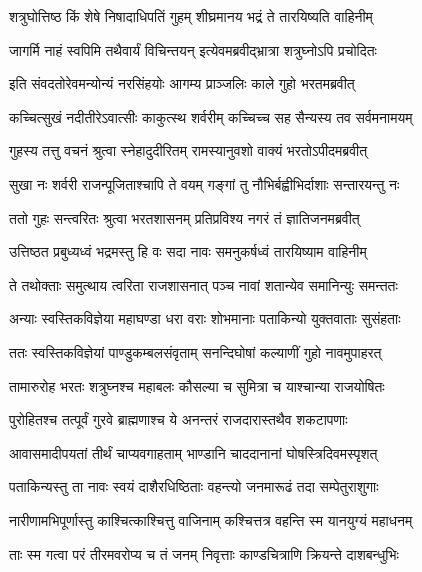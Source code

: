 \twolineshloka
{शत्रुघोत्तिष्ठ किं शेषे निषादाधिपतिं गुहम्}
{शीघ्रमानय भद्रं ते तारयिष्यति वाहिनीम्} %

\twolineshloka
{जागर्मि नाहं स्वपिमि तथैवार्यं विचिन्तयन्}
{इत्येवमब्रवीद्भ्रात्रा शत्रुघ्नोऽपि प्रचोदितः} %

\twolineshloka
{इति संवदतोरेवमन्योन्यं नरसिंहयोः}
{आगम्य प्राञ्जलिः काले गुहो भरतमब्रवीत्} %

\twolineshloka
{कच्चित्सुखं नदीतीरेऽवात्सीः काकुत्स्थ शर्वरीम्}
{कच्चिच्च सह सैन्यस्य तव सर्वमनामयम्} %

\twolineshloka
{गुहस्य तत्तु वचनं श्रुत्वा स्नेहादुदीरितम्}
{रामस्यानुवशो वाक्यं भरतोऽपीदमब्रवीत्} %

\twolineshloka
{सुखा नः शर्वरी राजन्पूजिताश्चापि ते वयम्}
{गङ्गां तु नौभिर्बह्वीभिर्दाशाः सन्तारयन्तु नः} %

\twolineshloka
{ततो गुहः सन्त्वरितः श्रुत्वा भरतशासनम्}
{प्रतिप्रविश्य नगरं तं ज्ञातिजनमब्रवीत्} %

\twolineshloka
{उत्तिष्ठत प्रबुध्यध्वं भद्रमस्तु हि वः सदा}
{नावः समनुकर्षध्वं तारयिष्याम वाहिनीम्} %

\twolineshloka
{ते तथोक्ताः समुत्थाय त्वरिता राजशासनात्}
{पञ्च नावां शतान्येव समानिन्युः समन्ततः} %

\twolineshloka
{अन्याः स्वस्तिकविज्ञेया महाघण्डा धरा वराः}
{शोभमानाः पताकिन्यो युक्तवाताः सुसंहताः} %

\twolineshloka
{ततः स्वस्तिकविज्ञेयां पाण्डुकम्बलसंवृताम्}
{सनन्दिघोषां कल्याणीं गुहो नावमुपाहरत्} %

\twolineshloka
{तामारुरोह भरतः शत्रुघ्नश्च महाबलः}
{कौसल्या च सुमित्रा च याश्चान्या राजयोषितः} %

\twolineshloka
{पुरोहितश्च तत्पूर्वं गुरवे ब्राह्मणाश्च ये}
{अनन्तरं राजदारास्तथैव शकटापणाः} %

\twolineshloka
{आवासमादीपयतां तीर्थं चाप्यवगाहताम्}
{भाण्डानि चाददानानां घोषस्त्रिदिवमस्पृशत्} %

\twolineshloka
{पताकिन्यस्तु ता नावः स्वयं दाशैरधिष्ठिताः}
{वहन्त्यो जनमारूढं तदा सम्पेतुराशुगाः} %

\twolineshloka
{नारीणामभिपूर्णास्तु काश्चित्काश्चित्तु वाजिनाम्}
{कश्चित्तत्र वहन्ति स्म यानयुग्यं महाधनम्} %

\twolineshloka
{ताः स्म गत्वा परं तीरमवरोप्य च तं जनम्}
{निवृत्ताः काण्डचित्राणि क्रियन्ते दाशबन्धुभिः} %

